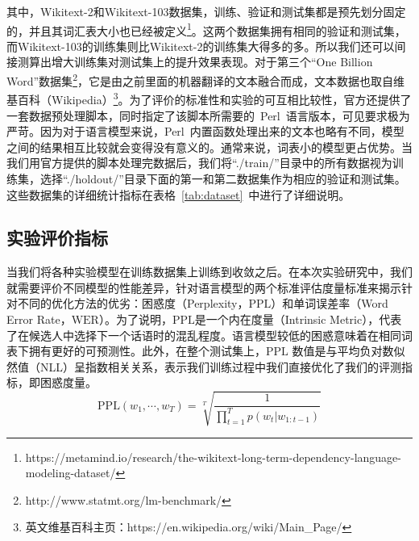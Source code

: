 其中，Wikitext-2和Wikitext-103数据集，训练、验证和测试集都是预先划分固定的，并且其词汇表大小也已经被定义\footnote{https://metamind.io/research/the-wikitext-long-term-dependency-language-modeling-dataset/}。这两个数据集拥有相同的验证和测试集，而Wikitext-103的训练集则比Wikitext-2的训练集大得多的多。所以我们还可以间接测算出增大训练集对测试集上的提升效果表现。对于第三个``One Billion Word''数据集\footnote{http://www.statmt.org/lm-benchmark/}，它是由之前里面的机器翻译的文本融合而成，文本数据也取自维基百科（Wikipedia）\footnote{英文维基百科主页：https://en.wikipedia.org/wiki/Main\_Page/}。为了评价的标准性和实验的可互相比较性，官方还提供了一套数据预处理脚本，同时指定了该脚本所需要的~Perl~语言版本，可见要求极为严苛。因为对于语言模型来说，Perl~内置函数处理出来的文本也略有不同，模型之间的结果相互比较就会变得没有意义的。通常来说，词表小的模型更占优势。当我们用官方提供的脚本处理完数据后，我们将``./train/''目录中的所有数据视为训练集，选择``./holdout/''目录下面的第一和第二数据集作为相应的验证和测试集。这些数据集的详细统计指标在表格~\ref{tab:dataset}~中进行了详细说明。

\subsection{实验评价指标}
当我们将各种实验模型在训练数据集上训练到收敛之后。在本次实验研究中，我们就需要评价不同模型的性能差异，针对语言模型的两个标准评估度量标准来揭示针对不同的优化方法的优劣：困惑度（Perplexity，$ \mathrm{PPL} $）和单词误差率（Word Error Rate，$\mathrm{WER} $）。为了说明，$ \mathrm{PPL} $是一个内在度量（Intrinsic Metric），代表了在候选人中选择下一个话语时的混乱程度。语言模型较低的困惑意味着在相同词表下拥有更好的可预测性。此外，在整个测试集上，$\mathrm{PPL}$ 数值是与平均负对数似然值（NLL）呈指数相关关系，表示我们训练过程中我们直接优化了我们的评测指标，即困惑度量。
\begin{equation}\label{equ:ppl}
   \mathrm{PPL}(w_1,\cdots,w_T)=\sqrt[T]{\frac{1}{\prod_{t=1}^T p(w_t|w_{1:t-1})}}
\end{equation}

